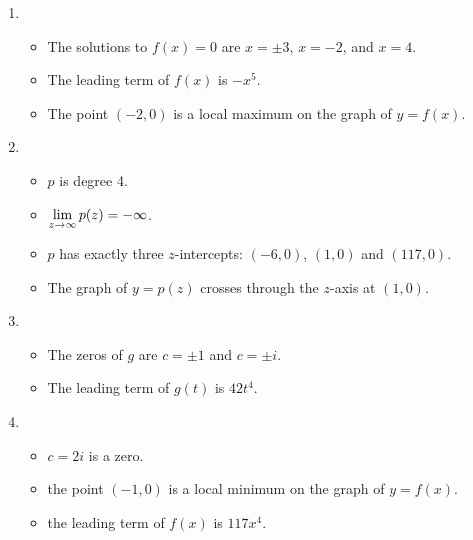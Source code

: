 \documentclass{ximera}
\begin{document}
\begin{enumerate}
\begin{itemize}
\end{itemize}

\enlargethispage{0.25in}

\item

\begin{itemize}

\item The solutions to $f(x) =0$ are $x = \pm 3$, $x=-2$, and $x=4$.
\item The leading term of $f(x)$ is $-x^5$.
\item The point $(-2, 0)$ is a local maximum on the graph of $y=f(x)$.

\end{itemize}

\item 

\begin{itemize}

\item $p$ is degree 4.
\item $\ds{\lim_{z \rightarrow \infty} p(z) =  -\infty}$.
\item $p$ has exactly three $z$-intercepts:  $(-6,0)$, $(1,0)$ and $(117,0)$.
\item  The graph of $y=p(z)$ crosses through the $z$-axis at $(1,0)$.

\end{itemize}



\item

\begin{itemize}

\item The zeros of $g$ are $c=\pm 1$ and $c = \pm i$.
\item The leading term of $g(t)$ is $42t^4$.

\end{itemize}


\item

\begin{itemize}

\item $c=2i$ is a zero.
\item the point $(-1,0)$ is a local minimum on the graph of $y=f(x)$.
\item the leading term of $f(x)$ is $117x^4$.

\end{itemize}



\end{enumerate}
\end{document}
